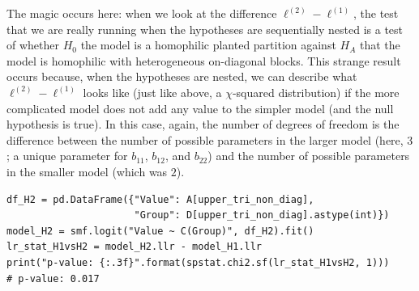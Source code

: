 The magic occurs here: when we look at the difference $\ell^{(2)} - \ell^{(1)}$, the test that we are really running when the hypotheses are sequentially nested is a test of whether $H_0$ the model is a homophilic planted partition against $H_A$ that the model is homophilic with heterogeneous on-diagonal blocks. This strange result occurs because, when the hypotheses are nested, we can describe what $\ell^{(2)} - \ell^{(1)}$ looks like (just like above, a $\chi$-squared distribution) if the more complicated model does not add any value to the simpler model (and the null hypothesis is true). In this case, again, the number of degrees of freedom is the difference between the number of possible parameters in the larger model (here, $3$; a unique parameter for $b_{11}$, $b_{12}$, and $b_{22}$) and the number of possible parameters in the smaller model (which was $2$). 

\begin{lstlisting}[style=python]
df_H2 = pd.DataFrame({"Value": A[upper_tri_non_diag],
                      "Group": D[upper_tri_non_diag].astype(int)})
model_H2 = smf.logit("Value ~ C(Group)", df_H2).fit()
lr_stat_H1vsH2 = model_H2.llr - model_H1.llr
print("p-value: {:.3f}".format(spstat.chi2.sf(lr_stat_H1vsH2, 1)))
# p-value: 0.017
\end{lstlisting}

\newpage